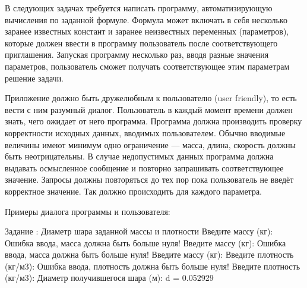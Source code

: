 
В следующих задачах требуется написать программу, автоматизирующую вычисления
по заданной формуле. Формула может включать в себя несколько заранее известных
констант и заранее неизвестных переменных (параметров), которые должен ввести
в программу пользователь после соответствующего приглашения. Запуская
программу несколько раз, вводя разные значения параметров, пользователь сможет
получать соответствующее этим параметрам решение задачи.

Приложение должно быть дружелюбным к пользователю (user friendly), то есть
вести с ним разумный диалог. Пользователь в каждый момент времени должен
знать, чего ожидает от него программа. Программа должна производить проверку
корректности исходных данных, вводимых пользователем.
Обычно вводимые величины имеют минимум одно ограничение --- масса, длина,
скорость должны быть неотрицательны.
В случае недопустимых данных программа должна выдавать осмысленное сообщение
и повторно запрашивать соответствующее значение. Запросы должны повторяться
до тех пор пока пользователь не введёт корректное значение. Так должно происходить
для каждого параметра.

Примеры диалога программы и пользователя:%

\begin{zzoutput}
  Задание : Диаметр шара заданной массы и плотности
  Введите массу (кг): 
  Ошибка ввода, масса должна быть больше нуля!
  Введите массу (кг): 
  Ошибка ввода, масса должна быть больше нуля!
  Введите массу (кг): 
  Введите плотность (кг/м3): 
  Ошибка ввода, плотность должна быть больше нуля!
  Введите плотность (кг/м3): 
  Диаметр получившегося шара (м): d = 0.052929
\end{zzoutput}


\zzsectionCOMMENTS


